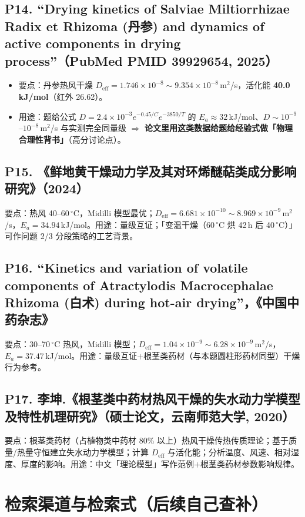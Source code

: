 \documentclass[12pt,a4paper]{ctexart}
\begin{document}
\subsection{P14. ``Drying kinetics of Salviae Miltiorrhizae Radix et Rhizoma (丹参) and dynamics of active components in drying process''（PubMed PMID 39929654, 2025）}
\begin{itemize}
\item 要点：丹参热风干燥 $D_{\mathrm{eff}}=1.746\times10^{-8}\sim9.354\times10^{-8}$\,m$^2$/s，活化能 \textbf{40.0\,kJ/mol}（红外 26.62）。
\item 用途：题给公式 $D=2.4\times10^{-3}e^{-0.45/C}e^{-3850/T}$ 的 $E_a\approx32$\,kJ/mol、$D\sim10^{-9}$--$10^{-8}$\,m$^2$/s 与实测完全同量级 $\Rightarrow$ \textbf{论文里用这类数据给题给经验式做「物理合理性背书」}（高分讨论点）。
\end{itemize}

\subsection{P15. 《鲜地黄干燥动力学及其对环烯醚萜类成分影响研究》（2024）}
要点：热风 40--60\,$^\circ$C，Midilli 模型最优；$D_{\mathrm{eff}}=6.681\times10^{-10}\sim8.969\times10^{-9}$\,m$^2$/s，$E_a=34.94$\,kJ/mol。用途：量级互证；「变温干燥（60\,$^\circ$C 烘 42\,h 后 40\,$^\circ$C）」可作问题 2/3 分段策略的工艺背景。

\subsection{P16. ``Kinetics and variation of volatile components of Atractylodis Macrocephalae Rhizoma (白术) during hot-air drying''，《中国中药杂志》}
要点：30--70\,$^\circ$C 热风，Midilli 模型；$D_{\mathrm{eff}}=1.04\times10^{-9}\sim6.28\times10^{-9}$\,m$^2$/s，$E_a=37.47$\,kJ/mol。用途：量级互证$+$根茎类药材（与本题圆柱形药材同型）干燥行为参考。

\subsection{P17. 李坤.《根茎类中药材热风干燥的失水动力学模型及特性机理研究》（硕士论文，云南师范大学, 2020）}
要点：根茎类药材（占植物类中药材 80\% 以上）热风干燥传热传质理论；基于质量/热量守恒建立失水动力学模型；计算 $D_{\mathrm{eff}}$ 与活化能；分析温度、风速、相对湿度、厚度的影响。用途：中文「理论模型」写作范例$+$根茎类药材参数影响规律。

\section{检索渠道与检索式（后续自己查补）}
\end{document}
